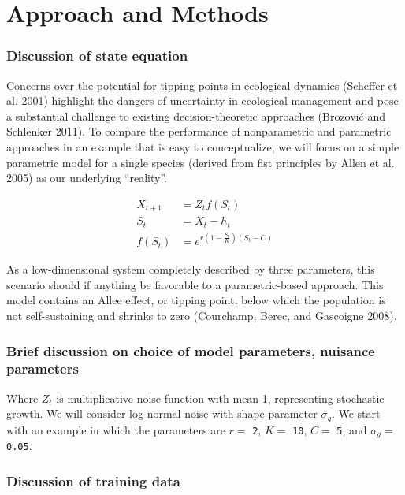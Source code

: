 \documentclass[author-year, review]{elsarticle} %
\begin{document}
\section{Approach and Methods}

\subsubsection{Discussion of state equation}

Concerns over the potential for tipping points in ecological dynamics
(Scheffer et al. 2001) highlight the dangers of uncertainty in
ecological management and pose a substantial challenge to existing
decision-theoretic approaches (Brozović and Schlenker 2011). To compare
the performance of nonparametric and parametric approaches in an example
that is easy to conceptualize, we will focus on a simple parametric
model for a single species (derived from fist principles by Allen et al.
2005) as our underlying ``reality''.

\begin{align}
X_{t+1} &= Z_t f(S_t) \\
S_t &= X_t - h_t \\
f(S_t) &= e^{r \left(1 - \frac{S_t}{K}\right)\left(S_t - C\right)}
\end{align}

As a low-dimensional system completely described by three parameters,
this scenario should if anything be favorable to a parametric-based
approach. This model contains an Allee effect, or tipping point, below
which the population is not self-sustaining and shrinks to zero
(Courchamp, Berec, and Gascoigne 2008).

\subsubsection{Brief discussion on choice of model parameters, nuisance
parameters}

Where $Z_t$ is multiplicative noise function with mean 1, representing
stochastic growth. We will consider log-normal noise with shape
parameter $\sigma_g$. We start with an example in which the parameters
are $r =$ \texttt{2}, $K =$ \texttt{10}, $C =$ \texttt{5}, and
$\sigma_g =$ \texttt{0.05}.

\subsubsection{Discussion of training data}
\end{document}
